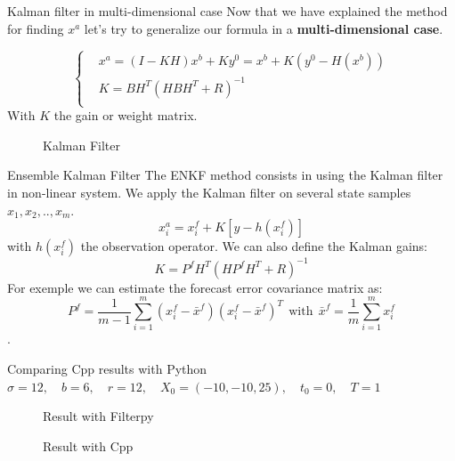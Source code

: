 \begin{frame}{Kalman filter in multi-dimensional case}
   Now that we have explained the method for finding $x^a$ let's try to generalize our formula in a \textbf{multi-dimensional case}.

   $$\left\{\begin{aligned}
     &x^a=(I-KH)x^b+Ky^0=x^b+K(y^0-H(x^b)) \\
           &K=BH^T(HBH^T+R)^{-1} \\
    \end{aligned}\right.$$
   With $K$ the gain or weight matrix.
   \begin{figure}[H]
       \caption{Kalman Filter}
   \end{figure}
\end{frame}
\begin{frame}{Ensemble Kalman Filter}
   The ENKF method consists in using the Kalman filter in non-linear system.
   \newline We apply the Kalman filter on several state samples $x_1,x_2,..,x_{m}$.
   $$x_i^a=x_i^f+K[y-h(x_i^f)]$$
   with $h(x_i^f)$ the observation operator.
   We can also define the Kalman gains: 
   $$K=P^f H^T(HP^f H^T+R)^{-1}$$
   For exemple we can estimate the
   forecast error covariance matrix as:
   $$P^f=\frac{1}{m-1}\sum_{i=1}^{m}(x_i^f-\bar{x}^f)(x_i^f-\bar{x}^f)^T~~\text{with}~~\bar{x}^f=\frac{1}{m}\sum_{i=1}^{m}x_i^f $$ .
\end{frame}
\begin{frame}{Comparing Cpp results with Python}
	\centering
$\sigma=12, \quad b=6, \quad r=12, \quad X_0=(-10,-10,25), \quad t_0=0, \quad T=1$
\begin{minipage}{0.48\linewidth}
	\begin{figure}[H]
		\caption{Result with Filterpy}
	\end{figure}
\end{minipage}
\begin{minipage}{0.48\linewidth}
	\begin{figure}[H]
		\caption{Result with Cpp}
	\end{figure}
\end{minipage}
\end{frame}
